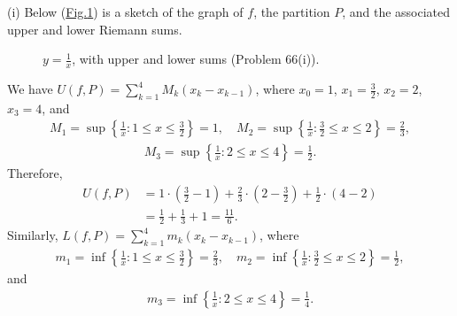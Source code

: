 \documentclass[letterpaper,10pt,english]{jupyterBook}
\let\sphinxpxdimen\pdfpxdimen\else\newdimen\sphinxpxdimen
\begin{document}
\sphinxAtStartPar
(i) Below (\hyperref[\detokenize{Solutions-full:q64i}]{Fig.\@ \ref{\detokenize{Solutions-full:q64i}}}) is a sketch of the graph of \(f\), the partition \(P\), and the associated upper and lower Riemann sums.

\begin{figure}[htbp]
\centering
\capstart

\noindent\sphinxincludegraphics[width=500\sphinxpxdimen]{{int1i}.png}
\caption{\(y=\frac{1}{x}\), with upper and lower sums (Problem 66(i)).}\label{\detokenize{Solutions-full:q64i}}\end{figure}

\sphinxAtStartPar
We have \(U(f,P) = \sum_{k=1}^4M_k(x_k-x_{k-1})\), where \(x_0=1\), \(x_1=\frac{3}{2}\), \(x_2=2\), \(x_3=4\), and
\begin{equation*}
\begin{split}
M_1=\sup\left\{\frac{1}{x}:1\leq x\leq\frac{3}{2}\right\}=1, \hspace{1em} M_2=\sup\left\{\frac{1}{x}:\frac{3}{2}\leq x\leq 2\right\}=\frac{2}{3},
\end{split}
\end{equation*}\begin{equation*}
\begin{split}
M_3=\sup\left\{\frac{1}{x}:2\leq x\leq 4\right\}=\frac{1}{2}.
\end{split}
\end{equation*}
\sphinxAtStartPar
Therefore,
\begin{align*}
U(f,P) &= 1\cdot\left(\frac{3}{2}-1\right) + \frac{2}{3}\cdot\left(2-\frac{3}{2}\right) + \frac{1}{2}\cdot(4-2) \\
&= \frac{1}{2} + \frac{1}{3} + 1 = \frac{11}{6}.
\end{align*}
\sphinxAtStartPar
Similarly, \(L(f,P) = \sum_{k=1}^4m_k(x_k-x_{k-1})\), where
\begin{equation*}
\begin{split}
m_1=\inf\left\{\frac{1}{x}:1\leq x\leq\frac{3}{2}\right\}=\frac{2}{3}, \hspace{1em} m_2=\inf\left\{\frac{1}{x}:\frac{3}{2}\leq x\leq 2\right\}=\frac{1}{2},
\end{split}
\end{equation*}
\sphinxAtStartPar
and
\begin{equation*}
\begin{split}
m_3=\inf\left\{\frac{1}{x}:2\leq x\leq 4\right\}=\frac{1}{4}.
\end{split}
\end{equation*}
\end{document}
